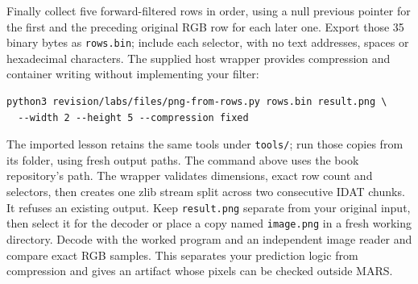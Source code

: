 Finally collect five forward-filtered rows in order, using a null previous
pointer for the first and the preceding original RGB row for each later one.
Export those 35 binary bytes as \texttt{rows.bin}; include each selector, with
no text addresses, spaces or hexadecimal characters. The supplied host wrapper
provides compression and container writing without implementing your filter:
\begin{Verbatim}
python3 revision/labs/files/png-from-rows.py rows.bin result.png \
  --width 2 --height 5 --compression fixed
\end{Verbatim}
The imported lesson retains the same tools under \texttt{tools/}; run those
copies from its folder, using fresh output paths. The command above uses the
book repository's path. The wrapper validates dimensions, exact row count and selectors, then creates one zlib
stream split across two consecutive IDAT chunks. It refuses an existing output.
Keep \texttt{result.png} separate from your original input, then select it for
the decoder or place a copy named \texttt{image.png} in a fresh working directory.
Decode with the worked program and an independent image reader and compare
exact RGB samples. This separates your prediction logic from compression and
gives an artifact whose pixels can be checked outside MARS.
